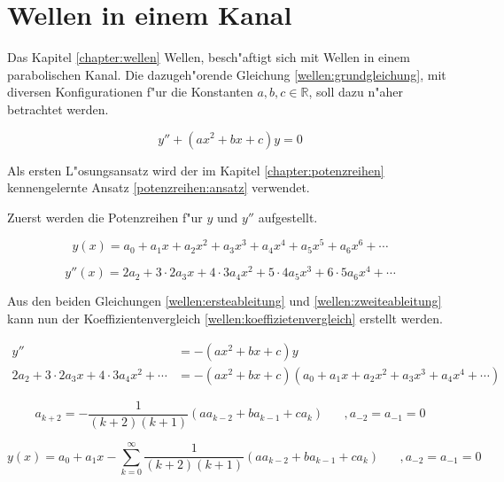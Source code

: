 \chapter{Wellen in einem Kanal\label{chapter:wellen}}
\begin{refsection}

Das Kapitel \ref{chapter:wellen} Wellen, besch"aftigt sich mit Wellen in einem 
parabolischen Kanal. Die dazugeh"orende Gleichung \ref{wellen:grundgleichung}, 
mit diversen Konfigurationen f"ur die Konstanten ${a,b,c} \in \mathbb{R}$, soll 
dazu n"aher betrachtet werden.

\begin{equation}
	y'' + (ax^2+bx+c)y
	=
	0
	\label{wellen:grundgleichung}
\end{equation}

Als ersten L"osungsansatz wird der im Kapitel \ref{chapter:potenzreihen} 
kennengelernte Ansatz \ref{potenzreihen:ansatz} verwendet.

Zuerst werden die Potenzreihen f"ur $y$ und $y''$ aufgestellt.

\begin{equation}
	y(x)
	=
	a_0 + a_1x + a_2x^2 + a_3x^3 + a_4x^4 + a_5x^5 + a_6x^6 + \dotsb
	\label{wellen:ersteableitung}
\end{equation}

\begin{equation}
	y''(x)
	=
	2a_2 + 3 \mathbin{\cdot} 2a_3x + 4 \mathbin{\cdot} 3a_4x^2 + 5 
	\mathbin{\cdot} 4a_5x^3 + 6 \mathbin{\cdot} 5a_6x^4 + \dotsb
	\label{wellen:zweiteableitung}
\end{equation}

Aus den beiden Gleichungen \ref{wellen:ersteableitung} und 
\ref{wellen:zweiteableitung} kann nun der Koeffizientenvergleich 
\ref{wellen:koeffizietenvergleich} erstellt werden.

\begin{equation}
	\begin{split}
		y''
		&=
		-(ax^2+bx+c)y \\
		2a_2 + 3 \mathbin{\cdot} 2a_3x + 4 \mathbin{\cdot} 3a_4x^2 + \dotsb
		&=
		-(ax^2+bx+c)(a_0 + a_1x + a_2x^2 + a_3x^3 + a_4x^4 + \dotsb)
	\end{split}
	\label{wellen:koeffizietenvergleich}
\end{equation}

\begin{equation}
	a_{k+2} = -\frac{1}{(k+2)(k+1)} (aa_{k-2}+ba_{k-1}+ca_k)
	\hspace{20pt}, a_{-2} = a_{-1} = 0
	\label{wellen:koeffizientengleichung}
\end{equation}

\begin{equation}
	y(x) = a_0 + a_1x 
	-\sum_{k=0}^{\infty}\frac{1}{(k+2)(k+1)}(aa_{k-2}+ba_{k-1}+ca_k)
	\hspace{20pt}, a_{-2} = a_{-1} = 0
	\label{wellen:yx}
\end{equation}

\printbibliography[heading=subbibliography]
\end{refsection}